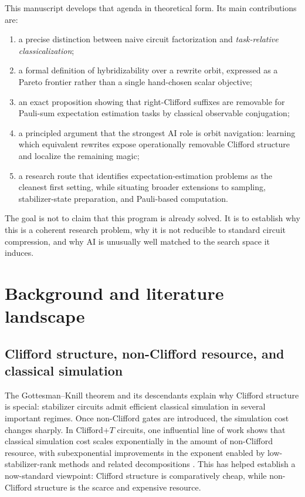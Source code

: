 \documentclass[11pt]{article}
\theoremstyle{remark}
\begin{document}
This manuscript develops that agenda in theoretical form. Its main contributions are:

\begin{enumerate}[label=(\roman*)]
    \item a precise distinction between naive circuit factorization and \emph{task-relative classicalization};
    \item a formal definition of hybridizability over a rewrite orbit, expressed as a Pareto frontier rather than a single hand-chosen scalar objective;
    \item an exact proposition showing that right-Clifford suffixes are removable for Pauli-sum expectation estimation tasks by classical observable conjugation;
    \item a principled argument that the strongest AI role is orbit navigation: learning which equivalent rewrites expose operationally removable Clifford structure and localize the remaining magic;
    \item a research route that identifies expectation-estimation problems as the cleanest first setting, while situating broader extensions to sampling, stabilizer-state preparation, and Pauli-based computation.
\end{enumerate}

The goal is not to claim that this program is already solved. It is to establish why this is a coherent research problem, why it is not reducible to standard circuit compression, and why AI is unusually well matched to the search space it induces.

\section{Background and literature landscape}

\subsection{Clifford structure, non-Clifford resource, and classical simulation}

The Gottesman--Knill theorem and its descendants explain why Clifford structure is special: stabilizer circuits admit efficient classical simulation in several important regimes. Once non-Clifford gates are introduced, the simulation cost changes sharply. In Clifford+$T$ circuits, one influential line of work shows that classical simulation cost scales exponentially in the amount of non-Clifford resource, with subexponential improvements in the exponent enabled by low-stabilizer-rank methods and related decompositions \cite{bravyi_gosset_2016}. This has helped establish a now-standard viewpoint: Clifford structure is comparatively cheap, while non-Clifford structure is the scarce and expensive resource.
\end{document}
